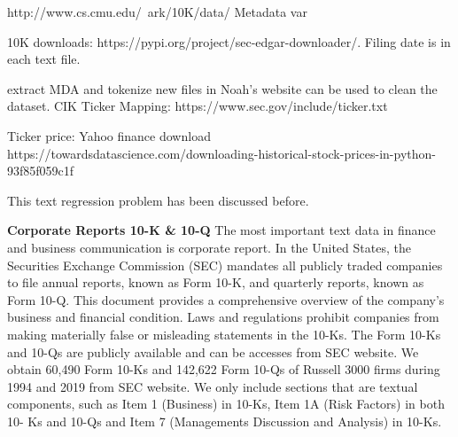\documentclass[11pt]{article}
\begin{document}
http://www.cs.cmu.edu/~ark/10K/data/
Metadata var

10K downloads: https://pypi.org/project/sec-edgar-downloader/. Filing
date is in each text file.

extract MDA and tokenize new files in Noah's website can be used to clean the dataset.
CIK Ticker Mapping: https://www.sec.gov/include/ticker.txt

Ticker price: Yahoo finance download https://towardsdatascience.com/downloading-historical-stock-prices-in-python-93f85f059c1f


This text regression problem has been discussed before.



\textbf{Corporate Reports 10-K \& 10-Q} The most important text data in finance and business communication is corporate report. In the United States,
the Securities Exchange Commission (SEC) mandates all publicly traded companies to file annual
reports, known as Form 10-K, and quarterly reports, known as Form 10-Q. This document provides a comprehensive overview of the company’s
business and financial condition. Laws and regulations prohibit companies from making materially
false or misleading statements in the 10-Ks. The
Form 10-Ks and 10-Qs are publicly available and can be accesses from
SEC website. We obtain 60,490 Form 10-Ks and 142,622
Form 10-Qs of Russell 3000 firms during 1994 and
2019 from SEC website. We only include sections that are textual components, such as Item 1 (Business) in 10-Ks, Item 1A (Risk Factors) in both 10-
Ks and 10-Qs and Item 7 (Managements Discussion and Analysis) in 10-Ks.




\end{document}
